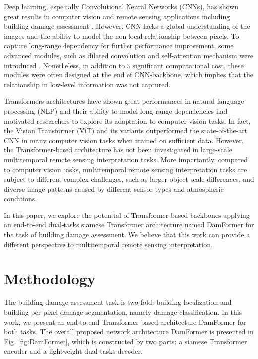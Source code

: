 \documentclass{article}
\begin{document}
\par Deep learning, especially Convolutional Neural Networks (CNNs), has shown great results in computer vision and remote sensing applications including building damage assessment \cite{rs12162532,Chen2020TGRS,ZHENG2021112636}.  However, CNN lacks a global understanding of the images and the ability to model the non-local relationship between pixels. To capture long-range dependency for further performance improvement, some advanced modules, such as dilated convolution and self-attention mechanism were introduced \cite{chen2017deeplab,zhang2019self}. Nonetheless, in addition to a significant computational cost, these modules were often designed at the end of CNN-backbone, which implies that the relationship in low-level information was not captured.

\par Transformers architectures \cite{vaswani2017attention} have shown great performances in natural language processing (NLP) and their ability to model long-range dependencies had motivated researchers to explore its adaptation to computer vision tasks. In fact, the Vision Transformer (ViT) \cite{dosovitskiy2021an}  and its variants \cite{xie2021segformer,Liu_2021_ICCV} outperformed the state-of-the-art CNN in many computer vision tasks when trained on sufficient data. However, the Transformer-based architecture has not been investigated in large-scale multitemporal remote sensing interpretation tasks. More importantly, compared to computer vision tasks, multitemporal remote sensing interpretation tasks are subject to different complex challenges, such as larger object scale differences, and diverse image patterns caused by different sensor types and atmospheric conditions. 

\par In this paper, we explore the potential of Transformer-based backbones applying an end-to-end dual-tasks siamese Transformer architecture named DamFormer for the task of building damage assessment. We believe that this work can provide a different perspective to multitemporal remote sensing interpretation.


\section{Methodology}\label{sec:2}
The building damage assessment task is two-fold:  building localization and building per-pixel damage segmentation, namely damage classification. In this work, we present an end-to-end Transformer-based architecture DamFormer for both tasks. The overall proposed network architecture DamFormer is presented in Fig. \ref{fig:DamFormer}, which is constructed by two parts: a siamese Transformer encoder and a lightweight dual-tasks decoder.  
\end{document}
